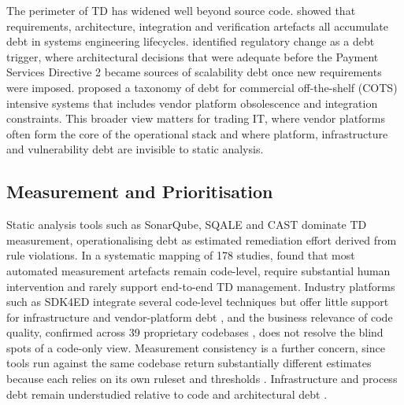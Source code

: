 \documentclass[
  authoryear,
  preprint]{elsarticle}
\begin{document}
The perimeter of TD has widened well beyond source code.
\citet{kleinwaksTechnicalDebtSystems2023} showed that requirements,
architecture, integration and verification artefacts all accumulate debt
in systems engineering lifecycles.
\citet{hanssenIdentifyingScalabilityDebt2019} identified regulatory
change as a debt trigger, where architectural decisions that were
adequate before the Payment Services Directive 2 became sources of
scalability debt once new requirements were imposed.
\citet{yangTaxonomyTechnicalDebt2019} proposed a taxonomy of debt for
commercial off-the-shelf (COTS) intensive systems that includes vendor
platform obsolescence and integration constraints. This broader view
matters for trading IT, where vendor platforms often form the core of
the operational stack and where platform, infrastructure and
vulnerability debt are invisible to static analysis.

\subsection{Measurement and
Prioritisation}\label{measurement-and-prioritisation}

Static analysis tools such as SonarQube, SQALE and CAST dominate TD
measurement, operationalising debt as estimated remediation effort
derived from rule violations. In a systematic mapping of 178 studies,
\citet{biazottoTechnicalDebtManagement2024} found that most automated
measurement artefacts remain code-level, require substantial human
intervention and rarely support end-to-end TD management. Industry
platforms such as SDK4ED integrate several code-level techniques but
offer little support for infrastructure and vendor-platform debt
\citep{ampatzoglouSDK4EDPlatformTechnical2022}, and the business
relevance of code quality, confirmed across 39 proprietary codebases
\citep{tornhillCodeRedBusiness2022}, does not resolve the blind spots of
a code-only view. Measurement consistency is a further concern, since
tools run against the same codebase return substantially different
estimates because each relies on its own ruleset and thresholds
\citep{amanatidisEvaluatingAgreementTechnical2020}. Infrastructure and
process debt remain understudied relative to code and architectural debt
\citep{albuquerqueManagingTechnicalDebt2023}.
\end{document}
